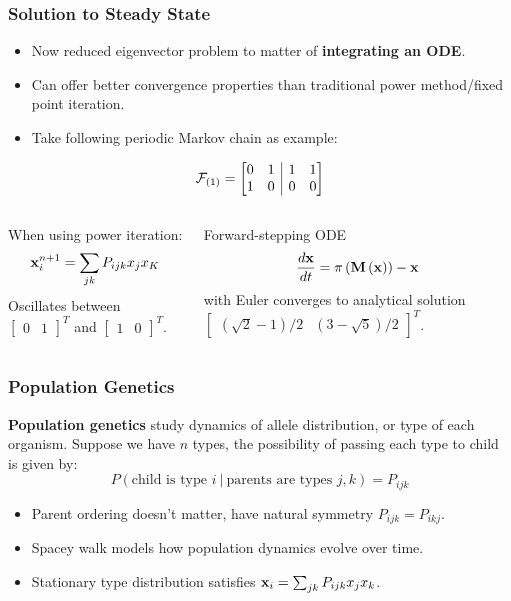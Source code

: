 \documentclass{beamer}
\begin{document}
\begin{frame}
  \frametitle{Solution to Steady State}
  \begin{itemize}
  \item Now reduced eigenvector problem to matter of \textbf{integrating an ODE}.
  \item Can offer better convergence properties than traditional power method/fixed point iteration.
  \item Take following periodic Markov chain as example:
  \end{itemize}
  \[ \mathcal{F}_{\left(1\right)} =
    \left[
      \begin{array}{@{}cc|cc@{}}
        0 & 1 & 1 & 1 \\
        1 & 0 & 0 & 0
      \end{array}
    \right]
  \]

  \begin{columns}
    \begin{column}{0.5\linewidth}
      When using power iteration:
      \[ {\bf x}^{n+1}_i = \sum_{jk} P_{ijk}x_jx_K \]
      Oscillates between $\begin{bmatrix}0&1\end{bmatrix}^T$ and $\begin{bmatrix}1&0\end{bmatrix}^T$.
    \end{column}
    \begin{column}{0.5\linewidth}
      Forward-stepping ODE
      \[ \frac{d{\bf x}}{dt} = \pi\left({\bf M}\left({\bf x}\right)\right) - {\bf x} \]
      with Euler converges to analytical solution $\begin{bmatrix} \left(\sqrt{2}-1\right)/2 & \left(3-\sqrt{5}\right)/2  \end{bmatrix}^T$.
    \end{column}
  \end{columns}
\end{frame}

\begin{frame}
  \frametitle{Population Genetics}
  \textbf{Population genetics} study dynamics of allele distribution, or type of each organism.  Suppose we have $n$ types, the possibility of passing each type to child is given by:
  \[ P\left(\text{child is type } i \:|\: \text{parents are types } j, k\right) = P_{ijk} \]
  \begin{itemize}
  	\item Parent ordering doesn't matter, have natural symmetry $P_{ijk}=P_{ikj}$.
  	\item Spacey walk models how population dynamics evolve over time.
  	\item Stationary type distribution satisfies ${\bf x}_i = \sum_{jk}P_{ijk}x_jx_k$.
  \end{itemize}

\end{frame}
\end{document}
